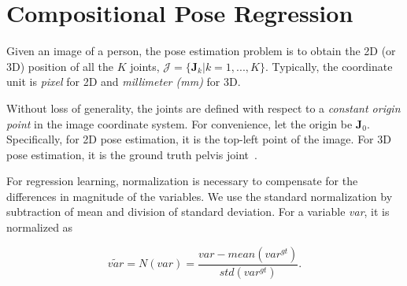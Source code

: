 \documentclass[10pt,twocolumn,letterpaper]{article}
\begin{document}
\begin{comment}
\begin{table}[t]
\centering
\footnotesize
\begin{tabular}{l|c|c|c|c|c|c|c}
\hline
Method & Head & Sho. & Elb. &Wri. &Hip&Knee&Ank.\\
\hline \hline
Carreira~\cite{carreira2016human} &95.7 &91.7 &81.7 &72.4 &82.8 &73.2 &66.4 \\
\hline
IEF*					  		  &96.3 &92.6 &83.1 &74.6 &83.7 &74.1 &71.4 \\
Ours (full) 					  &$\mathbf{97.5}$ & $\mathbf{94.3}$ & $\mathbf{87.0}$ & $\mathbf{81.2}$ & $\mathbf{86.5}$ & $\mathbf{78.5}$ & $\mathbf{75.4}$ \\
\hline
\end{tabular}
\caption{Per-joint evaluation result. PCKH 0.5 metric is used. IEF* and Ours (full) are the same as in Table~\ref{table:mpii_ablation} (stage 1) and~\ref{table:mpii_comparison}.}
\label{table:mpii_comparison_IEF}
\end{table}

\end{comment}


\section{Compositional Pose Regression}
\label{sec.compositional_pose_regression}

Given an image of a person, the pose estimation problem is to obtain the 2D (or 3D) position of all the $K$ joints, $\mathcal{J}=\{\mathbf{J}_k|k=1,...,K\}$. Typically, the coordinate unit is \emph{pixel} for 2D and \emph{millimeter (mm)} for 3D.

Without loss of generality, the joints are defined with respect to a \emph{constant origin point} in the image coordinate system. For convenience, let the origin be $\mathbf{J}_0$. Specifically, for 2D pose estimation, it is the top-left point of the image. For 3D pose estimation, it is the ground truth pelvis joint~\cite{zhou2016deep,park20163d}.

For regression learning, normalization is necessary to compensate for the differences in  magnitude of the variables. We use the standard normalization by subtraction of mean and division of standard deviation. For a variable \emph{var}, it is normalized as

\begin{equation}
\tilde{var}=N(var)=\frac{var-mean(var^{gt})}{std(var^{gt})}.
\label{eq.normalization}
\end{equation}
\end{document}
